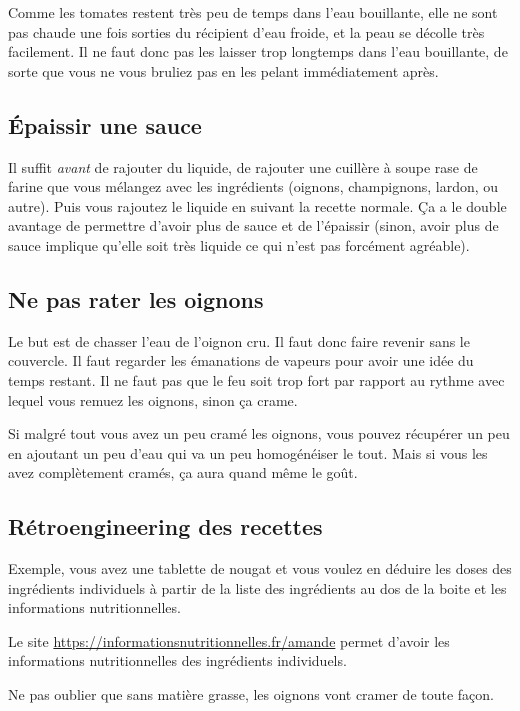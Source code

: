 \documentclass[a4paper,twoside,openright]{report}
\begin{document}
\begin{remarque}
Comme les tomates restent très peu de temps dans l'eau bouillante, elle ne sont pas chaude une fois sorties du récipient d'eau froide, et la peau se décolle très facilement. Il ne faut donc pas les laisser trop longtemps dans l'eau bouillante, de sorte que vous ne vous bruliez pas en les pelant immédiatement après.
\end{remarque}

\subsection{Épaissir une sauce}
Il suffit \emph{avant} de rajouter du liquide, de rajouter une cuillère à soupe rase de farine que vous mélangez avec les ingrédients (oignons, champignons, lardon, ou autre). Puis vous rajoutez le liquide en suivant la recette normale. Ça a le double avantage de permettre d'avoir plus de sauce et de l'épaissir (sinon, avoir plus de sauce implique qu'elle soit très liquide ce qui n'est pas forcément agréable).

\subsection{Ne pas rater les oignons}
Le but est de chasser l'eau de l'oignon cru. Il faut donc faire revenir sans le couvercle. Il faut regarder les émanations de vapeurs pour avoir une idée du temps restant. Il ne faut pas que le feu soit trop fort par rapport au rythme avec lequel vous remuez les oignons, sinon ça crame. 

Si malgré tout vous avez un peu cramé les oignons, vous pouvez récupérer un peu en ajoutant un peu d'eau qui va un peu homogénéiser le tout. Mais si vous les avez complètement cramés, ça aura quand même le goût.

\subsection{Rétroengineering des recettes}
Exemple, vous avez une tablette de nougat et vous voulez en déduire les doses des ingrédients individuels à partir de la liste des ingrédients au dos de la boite et les informations nutritionnelles. 

Le site \url{https://informationsnutritionnelles.fr/amande} permet d'avoir les informations nutritionnelles des ingrédients individuels.

\begin{remarque}
Ne pas oublier que sans matière grasse, les oignons vont cramer de toute façon.
\end{remarque}
\end{document}

